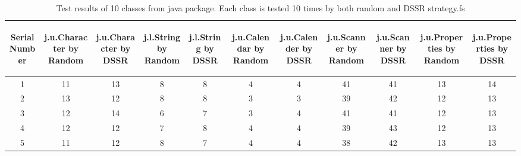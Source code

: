\documentclass[10pt, conference, compsocconf]{IEEEtran}
\begin{document}
\begin{table}[ht]
\caption{Test results of 10 classes from java package. Each class is tested 10 times by both random and DSSR strategy.fs} %
\centering %
\begin{tabular}{| c | c | c | c | c | c | c | c | c | c | c |} %
\hline\hline %
 \begin{sideways} Serial Number \end{sideways} &  \begin{sideways} j.u.Character by Random \end{sideways} &  \begin{sideways} j.u.Character by DSSR \end{sideways} &  \begin{sideways} j.l.String by Random \end{sideways} &  \begin{sideways} j.l.String by DSSR \end{sideways} & \begin{sideways} j.u.Calendar by Random \end{sideways} &  \begin{sideways}j.u.Calender by DSSR \end{sideways} &  \begin{sideways}j.u.Scanner by Random \end{sideways} &  \begin{sideways} j.u.Scanner by DSSR \end{sideways} &  \begin{sideways} j.u.Properties by Random \end{sideways} &  \begin{sideways} j.u.Properties by DSSR \end{sideways}  \\ [0.5ex] %
\hline %
1 & 11 & 13 & 8 & 8 & 4 & 4 & 41 & 41 & 13 & 14\\ %

2 & 13 & 12 & 8 & 8 & 3 & 3 & 39 & 42 & 12 & 13\\

3 & 12 & 14 & 6 & 7 & 3 & 4 & 41 & 41 & 12 & 13\\

4 & 12 & 12 & 7 & 8 & 4 & 4 & 39 & 43 & 12 & 13\\

5 & 11 & 12 & 8 & 7 & 4 & 4 & 38 & 42 & 13 & 13\\


\end{tabular}
\end{table}
\end{document}
